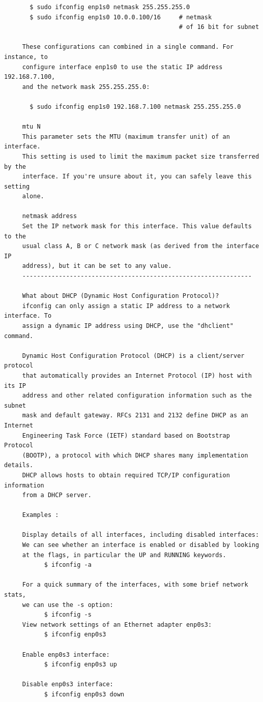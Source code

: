 \documentclass[a4paper,12pt]{article}
\begin{document}
\begin{verbatim}
       $ sudo ifconfig enp1s0 netmask 255.255.255.0
       $ sudo ifconfig enp1s0 10.0.0.100/16     # netmask 
                                                # of 16 bit for subnet
     
     These configurations can combined in a single command. For instance, to    
     configure interface enp1s0 to use the static IP address 192.168.7.100, 
     and the network mask 255.255.255.0:
     
       $ sudo ifconfig enp1s0 192.168.7.100 netmask 255.255.255.0
     
     mtu N	
     This parameter sets the MTU (maximum transfer unit) of an interface. 
     This setting is used to limit the maximum packet size transferred by the 
     interface. If you're unsure about it, you can safely leave this setting 
     alone.  
     
     netmask address	
     Set the IP network mask for this interface. This value defaults to the 
     usual class A, B or C network mask (as derived from the interface IP 
     address), but it can be set to any value.      
     ---------------------------------------------------------------
     
     What about DHCP (Dynamic Host Configuration Protocol)?
     ifconfig can only assign a static IP address to a network interface. To    
     assign a dynamic IP address using DHCP, use the "dhclient" command.
     
     Dynamic Host Configuration Protocol (DHCP) is a client/server protocol 
     that automatically provides an Internet Protocol (IP) host with its IP 
     address and other related configuration information such as the subnet 
     mask and default gateway. RFCs 2131 and 2132 define DHCP as an Internet 
     Engineering Task Force (IETF) standard based on Bootstrap Protocol 
     (BOOTP), a protocol with which DHCP shares many implementation details. 
     DHCP allows hosts to obtain required TCP/IP configuration information 
     from a DHCP server. 
       
     Examples : 
     
     Display details of all interfaces, including disabled interfaces:
     We can see whether an interface is enabled or disabled by looking
     at the flags, in particular the UP and RUNNING keywords.
           $ ifconfig -a
     
     For a quick summary of the interfaces, with some brief network stats,
     we can use the -s option:
           $ ifconfig -s   
     View network settings of an Ethernet adapter enp0s3:
           $ ifconfig enp0s3
           
     Enable enp0s3 interface: 
           $ ifconfig enp0s3 up 
           
     Disable enp0s3 interface:
           $ ifconfig enp0s3 down          
      

\end{verbatim}
\end{document}
